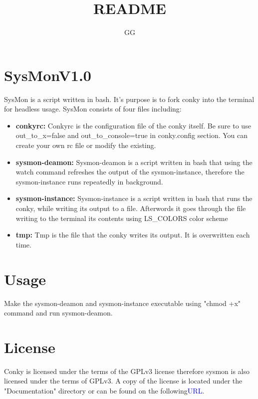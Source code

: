 \documentclass[10pt,a4paper]{report}
\author{GG}
\title{README}
\date{}
\begin{document}
\maketitle

\section*{SysMonV1.0}	%
SysMon is a script written in bash. It's purpose is to fork conky into the terminal for headless usage. 
SysMon consists of four files including:
\begin{itemize}
	\item{\textbf{conkyrc:}} Conkyrc is the configuration file of the conky itself. Be sure to use out\_to\_x=false and
	out\_to\_console=true in conky.config section. You can create your own rc file or modify the existing.

	\item{\textbf{sysmon-deamon:}} Sysmon-deamon is a script written in bash that using the watch command   
	refreshes the output of the sysmon-instance, therefore the sysmon-instance runs repeatedly in background. 
	
	\item{\textbf{sysmon-instance:}} Sysmon-instance is a script written in bash that runs the conky, while writing 
	its output to a file. Afterwords it goes through the file writing to the terminal its contents using
	LS\_COLORS  color scheme 

	\item{\textbf{tmp:} } Tmp is the file that the conky writes its output. It is overwritten each time.
\end{itemize}

\section*{Usage} Make the sysmon-deamon and sysmon-instance executable using "chmod +x" command
and run sysmon-deamon.

\section*{License} Conky is licensed under the terms of the GPLv3 license therefore sysmon is also licensed under the
terms of GPLv3. A copy of the license is located under the "Documentation" directory or can be found on the 
following{\textcolor{blue}{URL}}.
\end{document}
